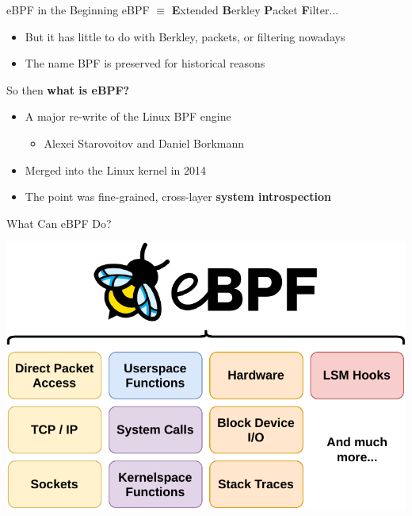 \documentclass[12pt, dvipsnames, aspectratio=169]{beamer}
\begin{document}
\begin{frame}[c]{eBPF in the Beginning}
eBPF $\equiv$ \textbf{E}xtended \textbf{B}erkley \textbf{P}acket \textbf{F}ilter...
\begin{itemize}
    \item But it has little to do with Berkley, packets, or filtering nowadays
    \item The name BPF is preserved for historical reasons
\end{itemize}
\vfill
So then \textbf{what is eBPF?}
\begin{itemize}
    \item A major re-write of the Linux BPF engine
    \begin{itemize}
        \item Alexei Starovoitov and Daniel Borkmann
    \end{itemize}
    \item Merged into the Linux kernel in 2014
    \item The point was fine-grained, cross-layer \textbf{system introspection}
\end{itemize}
\end{frame}

\begin{frame}[c]{What Can eBPF Do?}
\begin{center}
    \color{black}
    \includegraphics[height=0.8\textheight]{figs/ebpf-overview.pdf}
\end{center}
\end{frame}
\end{document}
